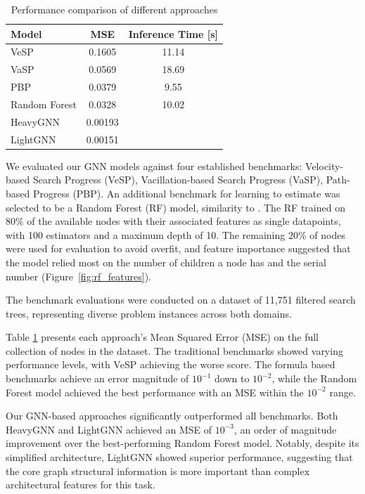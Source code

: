 \documentclass[letterpaper]{article}
\newcommand{\gur}[1]{{\color{teal}{Gur: #1}}}
\begin{document}
\begin{table}[t]
    \centering
    \caption{Performance comparison of different approaches}
    \label{tab:performance}
    \begin{tabular}{|l|c|c|}
    \hline
    \textbf{Model} & \textbf{MSE} & \textbf{Inference Time [s]}\\
    \hline
    VeSP & 0.1605 & 11.14 \\
    VaSP & 0.0569 & 18.69 \\
    PBP & 0.0379 & 9.55 \\
    Random Forest & 0.0328 & 10.02 \\
    HeavyGNN & 0.00193 & \\
    LightGNN & 0.00151 & \\
    \hline
    \end{tabular}
\end{table}


We evaluated our GNN models against four established benchmarks: Velocity-based Search Progress (VeSP), Vacillation-based Search Progress (VaSP), Path-based Progress (PBP). An additional benchmark for learning to estimate was selected to be a Random Forest (RF) model, similarity to \citet{sudry2022learning}.
The RF trained on $80\%$ of the available nodes with their associated features as single datapoints, with 100 estimators and a maximum depth of 10. The remaining $20\%$ of nodes were used for evaluation to avoid overfit, and feature importance suggested that the model relied most on the number of children a node has and the serial number (Figure~\ref{fig:rf_features}).

The benchmark evaluations were conducted on a dataset of 11,751 filtered search trees, representing diverse problem instances across both domains. \gur{More details}

Table \ref{tab:performance} presents each approach's Mean Squared Error (MSE) on the full collection of nodes in the dataset. The traditional benchmarks showed varying performance levels, with VeSP achieving the worse score. The formula based benchmarks achieve an error magnitude of $10^{-1}$ down to $10^{-2}$, while the Random Forest model achieved the best performance with an MSE within the $10^{-2}$ range. 

Our GNN-based approaches significantly outperformed all benchmarks. Both HeavyGNN and LightGNN achieved an MSE of $10^{-3}$, an order of magnitude improvement over the best-performing Random Forest model. Notably, despite its simplified architecture, LightGNN showed superior performance, suggesting that the core graph structural information is more important than complex architectural features for this task.
\end{document}
